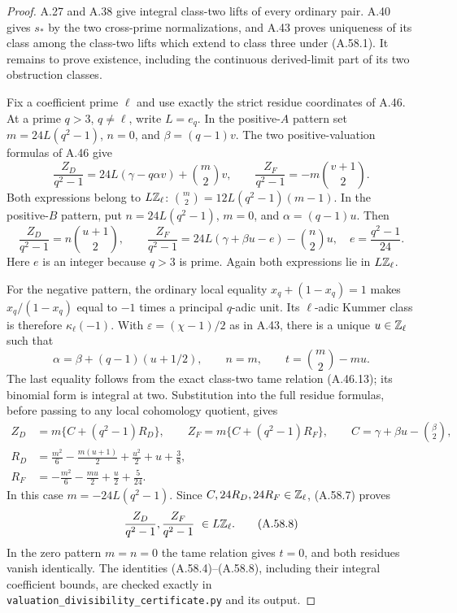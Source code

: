 \begin{proof}
A.27 and A.38 give integral class-two lifts of every ordinary
pair.  A.40 gives $s_*$ by the two cross-prime normalizations,
and A.43 proves uniqueness of its class among the class-two
lifts which extend to class three under (A.58.1).
It remains to prove existence, including the continuous
derived-limit part of its two obstruction classes.

Fix a coefficient prime $\ell$ and use exactly the strict
residue coordinates of A.46.  At a prime $q>3$, $q\ne\ell$,
write $L=e_q$.  In the positive-$A$ pattern set
$m=24L(q^2-1)$, $n=0$, and $\beta=(q-1)v$.
The two positive-valuation formulas of A.46 give
\[
 \frac{Z_D}{q^2-1}
       =24L(\gamma-q\alpha v)+\binom m2v,\qquad
 \frac{Z_F}{q^2-1}=-m\binom{v+1}{2}.
 \tag{A.58.4}
\]
Both expressions belong to $L\mathbb Z_\ell$:
$\binom m2=12L(q^2-1)(m-1)$.
In the positive-$B$ pattern, put $n=24L(q^2-1)$,
$m=0$, and $\alpha=(q-1)u$.  Then
\[
 \frac{Z_D}{q^2-1}=n\binom{u+1}{2},\qquad
 \frac{Z_F}{q^2-1}
       =24L(\gamma+\beta u-e)-\binom n2u,
       \quad e=\frac{q^2-1}{24}.
 \tag{A.58.5}
\]
Here $e$ is an integer because $q>3$ is prime.  Again both
expressions lie in $L\mathbb Z_\ell$.

For the negative pattern, the ordinary local equality
$x_q+(1-x_q)=1$ makes $x_q/(1-x_q)$ equal to $-1$ times
a principal $q$-adic unit.  Its $\ell$-adic Kummer class
is therefore $\kappa_\ell(-1)$.  With
$\varepsilon=(\chi-1)/2$ as in A.43, there is a unique
$u\in\mathbb Z_\ell$ such that
\[
 \alpha=\beta+(q-1)(u+1/2),\qquad n=m,
 \qquad t=\binom m2-mu.
 \tag{A.58.6}
\]
The last equality follows from the exact class-two tame
relation (A.46.13); its binomial form is integral at two.
Substitution into the full residue formulas, before passing
to any local cohomology quotient, gives
\[
 \begin{split}
 Z_D&=m\{C+(q^2-1)R_D\},\qquad
 Z_F=m\{C+(q^2-1)R_F\},\qquad
 C=\gamma+\beta u-\binom\beta2,\\
 R_D&=\frac{m^2}{6}-\frac{m(u+1)}2
                        +\frac{u^2}{2}+u+\frac38,\\
 R_F&=-\frac{m^2}{6}-\frac{mu}{2}
                                      +\frac u2+\frac5{24}.
 \end{split}
 \tag{A.58.7}
\]
In this case $m=-24L(q^2-1)$.  Since
$C,24R_D,24R_F\in\mathbb Z_\ell$, (A.58.7) proves
\[
           \frac{Z_D}{q^2-1},\frac{Z_F}{q^2-1}
                                      \ \in L\mathbb Z_\ell.
 \tag{A.58.8}
\]
In the zero pattern $m=n=0$ the tame relation gives $t=0$,
and both residues vanish identically.
The identities (A.58.4)--(A.58.8), including their integral
coefficient bounds, are checked exactly in
\texttt{valuation\_divisibility\_certificate.py} and its output.


\end{proof}
